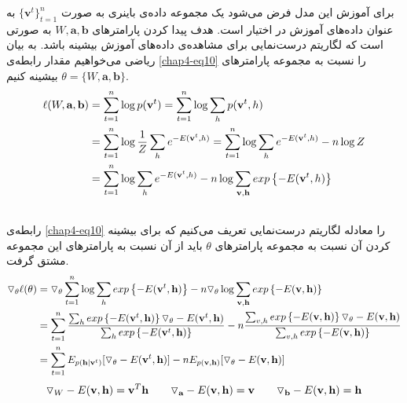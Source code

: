 برای آموزش این مدل فرض می‌‌شود یک مجموعه داده‌ی باینری به صورت
$\{\textbf{v}^{t}\}_{t=1}^{n}$
به عنوان داده‌های آموزش در اختیار است. هدف پیدا کردن پارامتر‌های
$W, \textbf{a}, \textbf{b}$
به صورتی‌ است که لگاریتم درست‌نمایی برای مشاهده‌ی داده‌های آموزش بیشینه باشد. به بیان ریاضی‌ می‌‌خواهیم مقدار رابطه‌ی
\ref{chap4-eq10}
را نسبت به مجموعه پارامتر‌های
$\theta = \{W, \textbf{a}, \textbf{b}\}$
بیشینه کنیم.
\begin{align}
	\centering
	\label{chap4-eq10}
	\ell(W, \textbf{a}, \textbf{b}) &= \sum_{t=1}^{n}\log p(\textbf{v}^t) = \sum_{t=1}^{n}\log \sum_h p(\textbf{v}^t, h)\\\nonumber
									&= \sum_{t=1}^{n}\log\dfrac{1}{Z} \sum_h e^{-E(\textbf{v}^t,h)} = \sum_{t=1}^{n}\log \sum_h e^{-E(\textbf{v}^t,h)} - n\log Z\\\nonumber
									&= \sum_{t=1}^{n}\log\sum_h e^{-E(\textbf{v}^t,h)} - n\log\sum_{\textbf{v},\textbf{h}}exp\left\lbrace -E(\textbf{v}^t,h)\right\rbrace\\\nonumber
\end{align}
رابطه‌ی
\ref{chap4-eq10}
را معاد‌له لگاریتم درست‌نمایی تعریف می‌‌کنیم که برای بیشینه کردن آن نسبت به مجموعه پارامتر‌های
$\theta$
باید از آن نسبت به پارامترهای این مجموعه مشتق گرفت.
\begin{align}
	\centering
	\label{chap4-eq11}
	\triangledown_\theta \ell(\theta) &= \triangledown_\theta \sum_{t=1}^{n} \log \sum_h exp \left\lbrace -E(\textbf{v}^t, \textbf{h}) \right\rbrace - n\triangledown_\theta \log \sum_{\textbf{v}, \textbf{h}} exp \left\lbrace -E(\textbf{v}, \textbf{h}) \right\rbrace \\\nonumber
	&=\sum_{t=1}^{n} \dfrac{\sum_h exp \left\lbrace -E(\textbf{v}^t, \textbf{h}) \right\rbrace \triangledown_\theta -E(\textbf{v}^t, \textbf{h})}{\sum_h exp \left\lbrace -E(\textbf{v}^t, \textbf{h}) \right\rbrace} - n \dfrac{\sum_{v,h} exp \left\lbrace -E(\textbf{v}, \textbf{h}) \right\rbrace \triangledown_\theta -E(\textbf{v}, \textbf{h})}{\sum_{v,h} exp \left\lbrace -E(\textbf{v}, \textbf{h}) \right\rbrace}\\\nonumber
	&=\sum_{t=1}^{n}E_{p(\textbf{h}|\textbf{v}^t)}[\triangledown_\theta -E(\textbf{v}^t, \textbf{h})] - nE_{p(\textbf{v},\textbf{h})}[\triangledown_\theta -E(\textbf{v}, \textbf{h})]
\end{align}
\begin{align}
	\centering
	\label{chap4-eq12}
	\triangledown_{W} -E(\textbf{v},\textbf{h}) = \textbf{v}^T\textbf{h} \qquad  \triangledown_{\textbf{a}} -E(\textbf{v},\textbf{h}) = \textbf{v} \qquad  \triangledown_{\textbf{b}} -E(\textbf{v},\textbf{h}) = \textbf{h}
\end{align}

